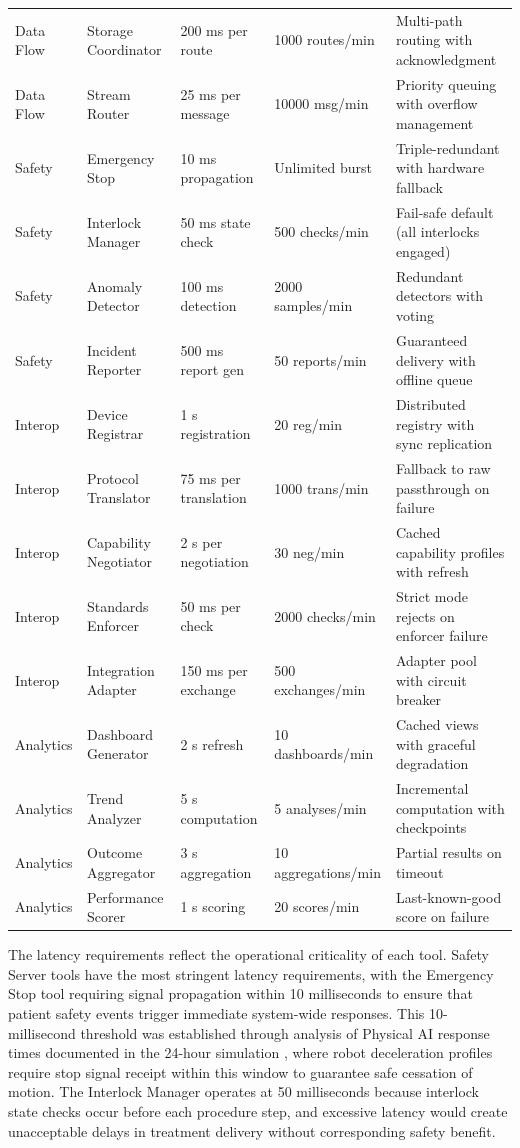 \begin{longtable}{l l p{2.8cm} p{2.2cm} p{3.5cm}}
Data Flow & Storage Coordinator & 200 ms per route & 1000 routes/min & Multi-path routing with acknowledgment \\
Data Flow & Stream Router & 25 ms per message & 10000 msg/min & Priority queuing with overflow management \\
\midrule
Safety & Emergency Stop & 10 ms propagation & Unlimited burst & Triple-redundant with hardware fallback \\
Safety & Interlock Manager & 50 ms state check & 500 checks/min & Fail-safe default (all interlocks engaged) \\
Safety & Anomaly Detector & 100 ms detection & 2000 samples/min & Redundant detectors with voting \\
Safety & Incident Reporter & 500 ms report gen & 50 reports/min & Guaranteed delivery with offline queue \\
\midrule
Interop & Device Registrar & 1 s registration & 20 reg/min & Distributed registry with sync replication \\
Interop & Protocol Translator & 75 ms per translation & 1000 trans/min & Fallback to raw passthrough on failure \\
Interop & Capability Negotiator & 2 s per negotiation & 30 neg/min & Cached capability profiles with refresh \\
Interop & Standards Enforcer & 50 ms per check & 2000 checks/min & Strict mode rejects on enforcer failure \\
Interop & Integration Adapter & 150 ms per exchange & 500 exchanges/min & Adapter pool with circuit breaker \\
\midrule
Analytics & Dashboard Generator & 2 s refresh & 10 dashboards/min & Cached views with graceful degradation \\
Analytics & Trend Analyzer & 5 s computation & 5 analyses/min & Incremental computation with checkpoints \\
Analytics & Outcome Aggregator & 3 s aggregation & 10 aggregations/min & Partial results on timeout \\
Analytics & Performance Scorer & 1 s scoring & 20 scores/min & Last-known-good score on failure \\
\end{longtable}

The latency requirements reflect the operational criticality of each tool.
Safety Server tools have the most stringent latency requirements, with the
Emergency Stop tool requiring signal propagation within 10 milliseconds to
ensure that patient safety events trigger immediate system-wide responses. This
10-millisecond threshold was established through analysis of Physical AI
response times documented in the 24-hour simulation \cite{site-docs}, where
robot deceleration profiles require stop signal receipt within this window to
guarantee safe cessation of motion. The Interlock Manager operates at 50
milliseconds because interlock state checks occur before each procedure step,
and excessive latency would create unacceptable delays in treatment delivery
without corresponding safety benefit.

